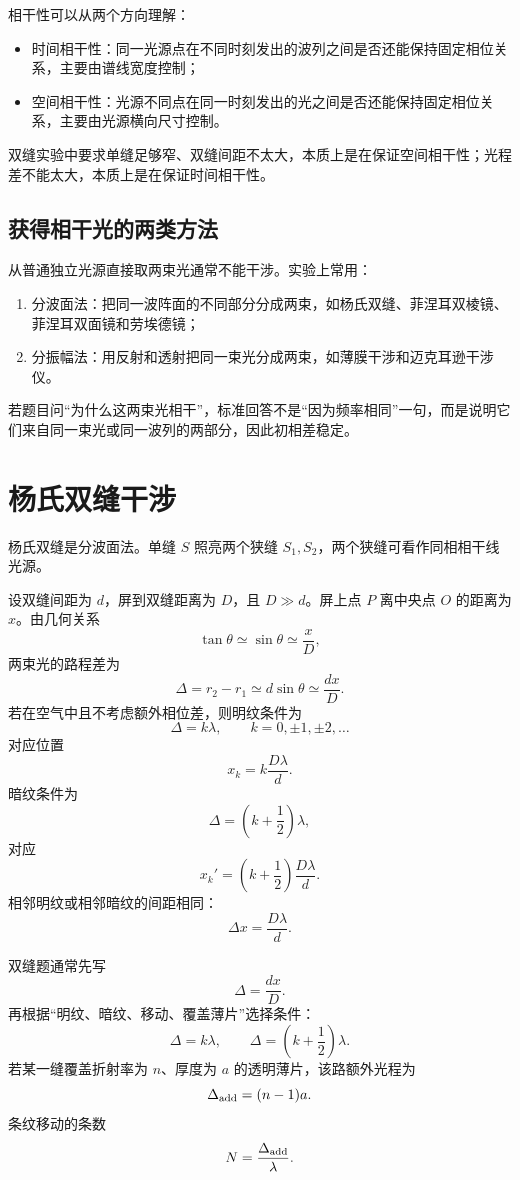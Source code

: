相干性可以从两个方向理解：
\begin{itemize}
  \item 时间相干性：同一光源点在不同时刻发出的波列之间是否还能保持固定相位关系，主要由谱线宽度控制；
  \item 空间相干性：光源不同点在同一时刻发出的光之间是否还能保持固定相位关系，主要由光源横向尺寸控制。
\end{itemize}
双缝实验中要求单缝足够窄、双缝间距不太大，本质上是在保证空间相干性；光程差不能太大，本质上是在保证时间相干性。

\subsection*{获得相干光的两类方法}

从普通独立光源直接取两束光通常不能干涉。实验上常用：
\begin{enumerate}
  \item 分波面法：把同一波阵面的不同部分分成两束，如杨氏双缝、菲涅耳双棱镜、菲涅耳双面镜和劳埃德镜；
  \item 分振幅法：用反射和透射把同一束光分成两束，如薄膜干涉和迈克耳逊干涉仪。
\end{enumerate}
若题目问“为什么这两束光相干”，标准回答不是“因为频率相同”一句，而是说明它们来自同一束光或同一波列的两部分，因此初相差稳定。

\section{杨氏双缝干涉}

杨氏双缝是分波面法。单缝 $S$ 照亮两个狭缝 $S_1,S_2$，两个狭缝可看作同相相干线光源。


设双缝间距为 $d$，屏到双缝距离为 $D$，且 $D\gg d$。屏上点 $P$ 离中央点 $O$ 的距离为 $x$。由几何关系
\[
  \tan\theta\simeq\sin\theta\simeq\frac{x}{D},
\]
两束光的路程差为
\[
  \Delta=r_2-r_1\simeq d\sin\theta\simeq\frac{dx}{D}.
\]
若在空气中且不考虑额外相位差，则明纹条件为
\[
  \Delta=k\lambda,\qquad k=0,\pm1,\pm2,\ldots
\]
对应位置
\[
  x_k=k\frac{D\lambda}{d}.
\]
暗纹条件为
\[
  \Delta=\left(k+\frac12\right)\lambda,
\]
对应
\[
  x_k'=\left(k+\frac12\right)\frac{D\lambda}{d}.
\]
相邻明纹或相邻暗纹的间距相同：
\[
  \Delta x=\frac{D\lambda}{d}.
\]

\begin{method}[双缝干涉题的标准入口]
双缝题通常先写
\[
  \Delta=\frac{dx}{D}.
\]
再根据“明纹、暗纹、移动、覆盖薄片”选择条件：
\[
  \Delta=k\lambda,\qquad
  \Delta=\left(k+\frac12\right)\lambda.
\]
若某一缝覆盖折射率为 $n$、厚度为 $a$ 的透明薄片，该路额外光程为
\[
  \Delta_{\rm add}=(n-1)a.
\]
条纹移动的条数
\[
  N=\frac{\Delta_{\rm add}}{\lambda}.
\]
\end{method}

